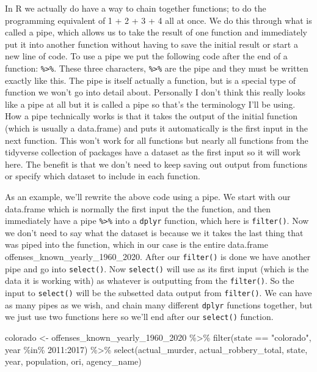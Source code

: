 \documentclass[
]{krantz}
\makeatletter
\newenvironment{Shaded}{\begin{snugshade}}{\end{snugshade}}
\newcommand{\DecValTok}[1]{\textcolor[rgb]{0.06,0.06,0.06}{#1}}
\newcommand{\FunctionTok}[1]{\textcolor[rgb]{0,0,0}{#1}}
\newcommand{\NormalTok}[1]{#1}
\newcommand{\OtherTok}[1]{\textcolor[rgb]{0.37,0.37,0.37}{#1}}
\newcommand{\SpecialCharTok}[1]{\textcolor[rgb]{0,0,0}{#1}}
\newcommand{\StringTok}[1]{\textcolor[rgb]{0.5,0.5,0.5}{#1}}
\newenvironment{kframe}{%
\medskip{}
\setlength{\fboxsep}{.8em}
 \def\at@end@of@kframe{}%
 \ifinner\ifhmode%
  \def\at@end@of@kframe{\end{minipage}}%
  \begin{minipage}{\columnwidth}%
 \fi\fi%
 \def\FrameCommand##1{\hskip\@totalleftmargin \hskip-\fboxsep
 \colorbox{shadecolor}{##1}\hskip-\fboxsep
     \hskip-\linewidth \hskip-\@totalleftmargin \hskip\columnwidth}%
 \MakeFramed {\advance\hsize-\width
   \@totalleftmargin\z@ \linewidth\hsize
   \@setminipage}}%
 {\par\unskip\endMakeFramed%
 \at@end@of@kframe}
\renewenvironment{Shaded}{\begin{kframe}}{\end{kframe}}
\makeatother
\begin{document}
In R we actually do have a way to chain together functions; to do the programming equivalent of 1 + 2 + 3 + 4 all at once. We do this through what is called a pipe, which allows us to take the result of one function and immediately put it into another function without having to save the initial result or start a new line of code. To use a pipe we put the following code after the end of a function: \texttt{\%\textgreater{}\%}. These three characters, \texttt{\%\textgreater{}\%} are the pipe and they must be written exactly like this. The pipe is itself actually a function, but is a special type of function we won't go into detail about. Personally I don't think this really looks like a pipe at all but it is called a pipe so that's the terminology I'll be using. How a pipe technically works is that it takes the output of the initial function (which is usually a data.frame) and puts it automatically is the first input in the next function. This won't work for all functions but nearly all functions from the tidyverse collection of packages have a dataset as the first input so it will work here. The benefit is that we don't need to keep saving out output from functions or specify which dataset to include in each function.

As an example, we'll rewrite the above code using a pipe. We start with our data.frame which is normally the first input the the function, and then immediately have a pipe \texttt{\%\textgreater{}\%} into a \texttt{dplyr} function, which here is \texttt{filter()}. Now we don't need to say what the dataset is because we it takes the last thing that was piped into the function, which in our case is the entire data.frame offenses\_known\_yearly\_1960\_2020. After our \texttt{filter()} is done we have another pipe and go into \texttt{select()}. Now \texttt{select()} will use as its first input (which is the data it is working with) as whatever is outputting from the \texttt{filter()}. So the input to \texttt{select()} will be the subsetted data output from \texttt{filter()}. We can have as many pipes as we wish, and chain many different \texttt{dplyr} functions together, but we just use two functions here so we'll end after our \texttt{select()} function.

\begin{Shaded}
\begin{Highlighting}[]
\NormalTok{colorado }\OtherTok{\textless{}{-}}\NormalTok{ offenses\_known\_yearly\_1960\_2020 }\SpecialCharTok{\%\textgreater{}\%}  \FunctionTok{filter}\NormalTok{(state }\SpecialCharTok{==} \StringTok{"colorado"}\NormalTok{, year }\SpecialCharTok{\%in\%} \DecValTok{2011}\SpecialCharTok{:}\DecValTok{2017}\NormalTok{) }\SpecialCharTok{\%\textgreater{}\%}   \FunctionTok{select}\NormalTok{(actual\_murder, actual\_robbery\_total, state, year, population, ori, agency\_name)}
\end{Highlighting}
\end{Shaded}
\end{document}
